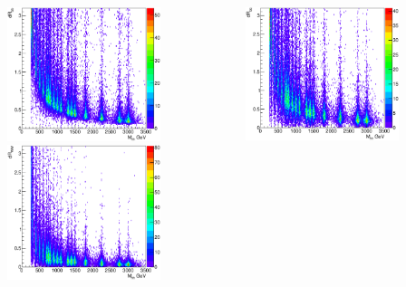 \documentclass{beamer}
\newcommand*{\header}[1]{\fontsize{16}{8}\selectfont \textbf{{\color{MyPurple}{#1}}}}
\begin{document}
\begin{frame}
\begin{center}
\header{Truth Study}
\end{center}
\vspace{-0.6cm}
\begin{columns}
\begin{column}{0.5\textwidth}
\begin{center}
\includegraphics[width=0.7\textwidth]{figures/drbb}\\
\includegraphics[width=0.7\textwidth]{figures/drWW}
\end{center}
\end{column}
\begin{column}{0.5\textwidth}
\begin{center}
\includegraphics[width=0.7\textwidth]{figures/drqq}\\

\end{center}
\end{column}
\end{columns}
\end{frame}
\end{document}
